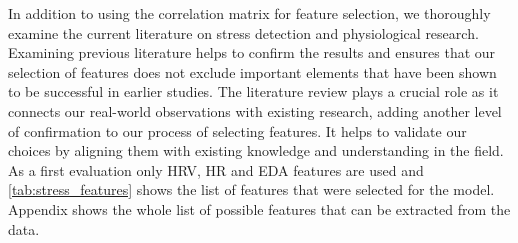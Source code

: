 In addition to using the correlation matrix for feature selection, we thoroughly examine the current literature on stress detection and physiological research. Examining previous literature helps to confirm the results and ensures that our selection of features does not exclude important elements that have been shown to be successful in earlier studies. The literature review plays a crucial role as it connects our real-world observations with existing research, adding another level of confirmation to our process of selecting features. It helps to validate our choices by aligning them with existing knowledge and understanding in the field. As a first evaluation only HRV, HR and EDA features are used and \autoref{tab:stress_features} shows the list of features that were selected for the model. Appendix shows the whole list of possible features that can be extracted from the data.




